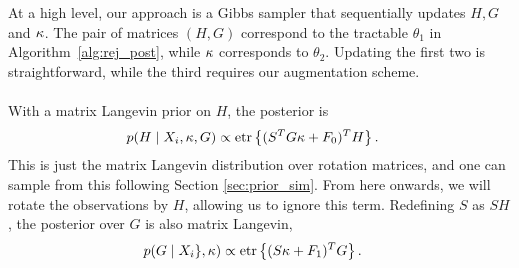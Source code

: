 At a high level, our approach is a Gibbs sampler that sequentially updates $H, G$ and $\kappa$. %
The pair of matrices $(H,G)$ correspond to the tractable $\theta_1$ in Algorithm~\ref{alg:rej_post}, while $\kappa$ corresponds to $\theta_2$.
Updating the first two is straightforward, while the third requires our augmentation scheme. \\
\hspace{.1in}\\
 \label{sec:update_conj} 
{With a matrix Langevin prior on $H$, the posterior is }
\begin{align}
  p(H\mid X_i,\bkappa, G) & \propto \etr\left\{(S^T G \bkappa + F_0)^T H\right\}. \nonumber
\end{align}
This is just the matrix Langevin distribution over rotation matrices, and one can sample from this following Section \ref{sec:prior_sim}.
From here onwards, we will rotate the observations by $H$, allowing us to ignore this term. Redefining $S$ as $SH$, the posterior over $G$ is also
matrix Langevin,
\begin{align}
  p(G\mid X_i\},\bkappa) & \propto \etr\left\{(S \bkappa + F_1)^T G\right\}. \nonumber
\end{align}

